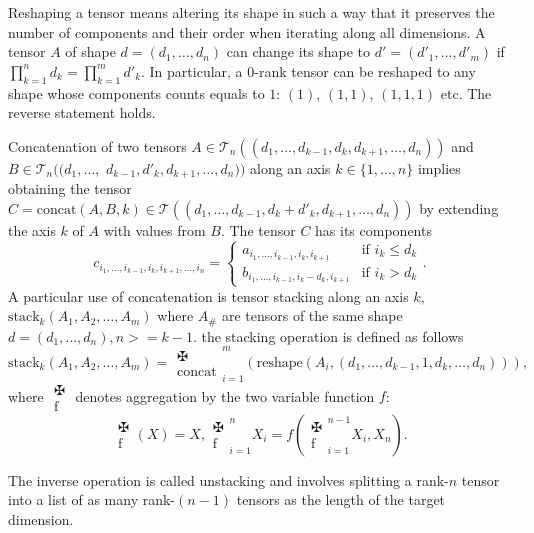 \par Reshaping \cite{TensorsAsMDArrays} a tensor means altering its shape in such a way that it preserves the number of components and their order when iterating along all dimensions. A tensor $A$ of shape $d=(d_1,\ldots,d_n)$ can change its shape to $d'=(d'_1,\ldots,d'_m)$ if $\prod_{k=1}^{n}{d_k}=\prod_{k=1}^{m}{d'_k}$. In particular, a $0$-rank tensor can be reshaped to any shape whose components counts equals to $1$: $(1)$, $(1,1)$, $(1,1,1)$ etc. The reverse statement holds.

\par Concatenation of two tensors $A\in\mathcal{T}_n((d_1, \ldots, d_{k-1},d_k, d_{k+1},\ldots,d_n))$ and $B\in\mathcal{T}_n((d_1, \ldots,$ $d_{k-1},d'_k, d_{k+1},\ldots,d_n))$ along an axis $k\in\{1,\ldots,n\}$ implies obtaining the tensor $C=\mathrm{concat}(A,B,k)\in\mathcal{T}((d_1, \ldots, d_{k-1},d_k+d'_k, d_{k+1},\ldots,d_n))$ by extending the axis $k$ of $A$ with values from $B$. The tensor $C$ has its components
$$c_{i_1,\ldots,i_{k-1},i_{k},i_{k+1},\ldots,i_n}=\begin{cases}
  a_{i_1,\ldots,i_{k-1},i_{k},i_{k+1}} & \text{if $i_k \leq d_k$} \\
  b_{i_1,\ldots,i_{k-1},i_{k}-d_k,i_{k+1}} & \text{if $i_k > d_k$} 
\end{cases}.$$
A particular use of concatenation is tensor stacking along an axis $k$, $\mathrm{stack}_{k}(A_1, A_2, \ldots, A_m)$ where $A_\#$ are tensors of the same shape $d=(d_1,\ldots,d_n), n>=k-1$. the stacking operation is defined as follows
$$\mathrm{stack}_{k}(A_1, A_2, \ldots, A_m)=\substack{\maltese \\ \mathrm{concat}}_{i=1}^{m}(\mathrm{reshape}(A_i, (d_1,\ldots,d_{k-1}, 1, d_{k},\ldots,d_n))),$$
where $\substack{\maltese \\ \mathrm{f}}$ denotes aggregation by the two variable function $f$: 
$$\substack{\maltese \\ \mathrm{f}}(X)=X, 
\substack{\maltese \\ \mathrm{f}}_{i=1}^{n} X_i = f(\substack{\maltese \\ \mathrm{f}}_{i=1}^{n-1}X_i, X_n).$$
\par The inverse operation is called unstacking and involves splitting a rank-$n$ tensor into a list of as many rank-$(n-1)$ tensors as the length of the target dimension.


